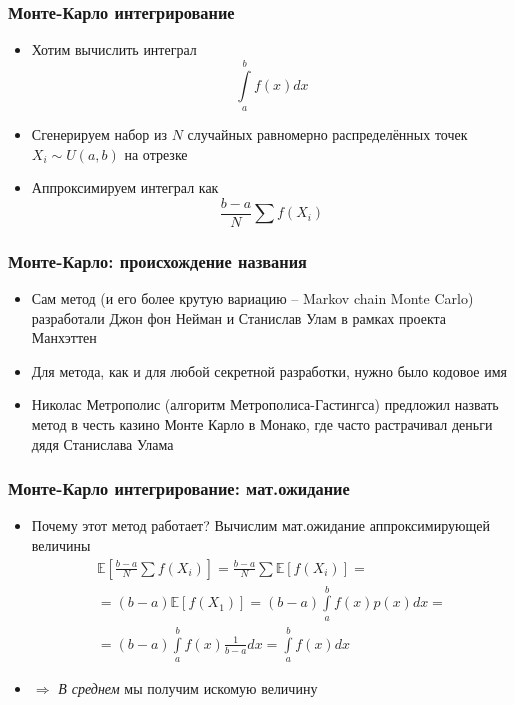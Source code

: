 \documentclass[handout,10pt]{beamer}
\begin{document}
\begin{frame}[fragile]
\frametitle{Монте-Карло интегрирование}
\begin{itemize}
\item Хотим вычислить интеграл
\begin{equation*}
\int\limits_a^b f(x)dx
\end{equation*}
\pause
\item Сгенерируем набор из \begin{math}N\end{math} случайных равномерно распределённых точек \begin{math}X_i \sim U(a,b)\end{math} на отрезке \begin{math}[a, b]\end{math}
\pause
\item Аппроксимируем интеграл как
\begin{equation*}
\frac{b-a}{N}\sum f(X_i)
\end{equation*}
\end{itemize}
\end{frame}

\begin{frame}[fragile]
\frametitle{Монте-Карло: происхождение названия}
\begin{itemize}
\item Сам метод (и его более крутую вариацию -- Markov chain Monte Carlo) разработали Джон фон Нейман и Станислав Улам в рамках проекта Манхэттен
\pause
\item Для метода, как и для любой секретной разработки, нужно было кодовое имя
\pause
\item Николас Метрополис (алгоритм Метрополиса-Гастингса) предложил назвать метод в честь казино Монте Карло в Монако, где часто растрачивал деньги дядя Станислава Улама
\end{itemize}
\end{frame}

\begin{frame}[fragile]
\frametitle{Монте-Карло интегрирование: мат.ожидание}
\begin{itemize}
\item Почему этот метод работает? \pause Вычислим мат.ожидание аппроксимирующей величины
\begin{gather*}
\mathbb{E}\left[\frac{b-a}{N}\sum f(X_i)\right] = \frac{b-a}{N}\sum\mathbb{E}[f(X_i)] = \\
= (b-a)\mathbb{E}[f(X_1)] = (b-a)\int\limits_a^b f(x)p(x)dx = \\
= (b-a)\int\limits_a^b f(x)\frac{1}{b-a}dx = \int\limits_a^b f(x)dx
\end{gather*}
\pause
\item \begin{math}\Longrightarrow\end{math} \textit{В среднем} мы получим искомую величину
\end{itemize}
\end{frame}
\end{document}
